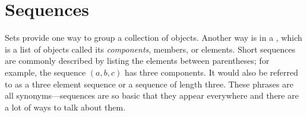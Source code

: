 \iffalse
Although the basic set operations and propositional connectives are
similar, it's important not to confuse one with the other.  For
example, $\union$ resembles $\QOR$, and in fact was defined directly
in terms of $\QOR$:
\[
x \in A \union B  \text{  is equivalent to  } (x \in A\ \QOR\ x \in B).
\]
Similarly, $\intersect$ resembles $\QAND$, and complement resembles $\QNOT$.
\iffalse
\[
x \in A \intersect B  \text{  is equivalent to  } x \in A\ \QAND\ x \in B,
\]
and
\[
x \in \bar{A}  \text{  is equivalent to  } \QNOT(x \in A).
\]
\fi

But if $A$ and $B$ are sets, writing $A\ \QAND\ B$ is a type-error,
since $\QAND$ is an operation on truth-values, not sets.  Similarly,
if $P$ and $Q$ are propositional variables, writing $P \union Q$ is
another type-error.
\fi


\begin{problems}

\practiceproblems
{}

\classproblems
{}

\homeworkproblems
{}

\examproblems
{}

\end{problems}

\section{Sequences}\label{seq_sec}

Sets provide one way to group a collection of objects.  Another way is
in a , which is a list of objects called its
\emph{components}, members, or elements.  Short sequences are commonly
described by listing the elements between parentheses; for example,
the sequence $(a, b, c)$ has three components.  It would also be
referred to as a three element sequence or a sequence of length three.
These phrases are all synonyms---sequences are so basic that they
appear everywhere and there are a lot of ways to talk about them.

